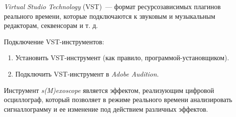 \documentclass{beamer}
\begin{document}
\begin{frame}
\textit{Virtual Studio Technology} (VST)~--- формат ресурсозависимых плагинов реального времени, которые подключаются к звуковым и музыкальным редакторам, секвенсорам и т. д.

Подключение VST-инструментов:
\begin{enumerate}
\item Установить VST-инструмент (как правило, программой-установщиком).
\item Подключить VST-инструмент в \textit{Adobe Audition}.
\end{enumerate}

\end{frame}

\begin{frame}
Инструмент \textit{s(M)exoscope} является эффектом, реализующим цифровой осциллограф, который позволяет в режиме реального времени анализировать сигналлограмму и ее изменение под действием различных эффектов. 

~

\end{frame}
\end{document}
